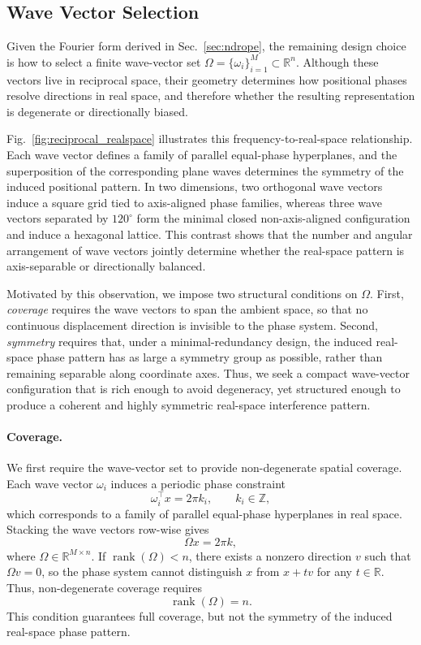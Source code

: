 \documentclass{article}
\theoremstyle{plain}
\theoremstyle{definition}
\theoremstyle{remark}
\begin{document}
\subsection{Wave Vector Selection}
\label{sec:omega_choice}
Given the Fourier form derived in Sec.~\ref{sec:ndrope}, the remaining design choice is how to select a finite wave-vector set $\Omega=\{\omega_i\}_{i=1}^M \subset \mathbb{R}^n$. Although these vectors live in reciprocal space, their geometry determines how positional phases resolve directions in real space, and therefore whether the resulting representation is degenerate or directionally biased.

Fig.~\ref{fig:reciprocal_realspace} illustrates this frequency-to-real-space relationship. Each wave vector defines a family of parallel equal-phase hyperplanes, and the superposition of the corresponding plane waves determines the symmetry of the induced positional pattern. In two dimensions, two orthogonal wave vectors induce a square grid tied to axis-aligned phase families, whereas three wave vectors separated by $120^\circ$ form the minimal closed non-axis-aligned configuration and induce a hexagonal lattice. 
This contrast shows that the number and angular arrangement of wave vectors jointly determine whether the real-space pattern is axis-separable or directionally balanced.

Motivated by this observation, we impose two structural conditions on $\Omega$. 
First, \emph{coverage} requires the wave vectors to span the ambient space, so that no continuous displacement direction is invisible to the phase system. 
Second, \emph{symmetry} requires that, under a minimal-redundancy design, the induced real-space phase pattern has as large a symmetry group as possible, rather than remaining separable along coordinate axes. 
Thus, we seek a compact wave-vector configuration that is rich enough to avoid degeneracy, yet structured enough to produce a coherent and highly symmetric real-space interference pattern.

\paragraph{Coverage.}
We first require the wave-vector set to provide non-degenerate spatial coverage. Each wave vector $\omega_i$ induces a periodic phase constraint
\begin{equation}
    \omega_i^\top x = 2\pi k_i,\qquad k_i\in\mathbb{Z},
\end{equation}
which corresponds to a family of parallel equal-phase hyperplanes in real space. 
Stacking the wave vectors row-wise gives
\begin{equation}
    \Omega x = 2\pi k,
\end{equation}
where $\Omega\in\mathbb{R}^{M\times n}$. If $\operatorname{rank}(\Omega)<n$, there exists a nonzero direction $v$ such that $\Omega v=0$, so the phase system cannot distinguish $x$ from $x+tv$ for any $t\in\mathbb{R}$. Thus, non-degenerate coverage requires
\begin{equation}
    \operatorname{rank}(\Omega)=n .
\end{equation}
This condition guarantees full coverage, but not the symmetry of the induced real-space phase pattern.
\end{document}

